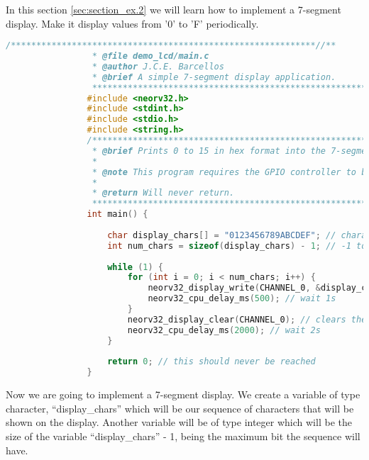         In this section \autoref{sec:section_ex.2} we will learn how to implement a 7-segment display. Make it display values from '0' to 'F' periodically. 

            \begin{lstlisting}[style=mystyle_c, language=c, breaklines]
                /************************************************************//**
                 * @file demo_lcd/main.c
                 * @author J.C.E. Barcellos
                 * @brief A simple 7-segment display application.
                 ***************************************************************/
                #include <neorv32.h>
                #include <stdint.h>
                #include <stdio.h>
                #include <string.h>
                /************************************************************//**
                 * @brief Prints 0 to 15 in hex format into the 7-segment display.
                 *
                 * @note This program requires the GPIO controller to be synthesized.
                 *
                 * @return Will never return.
                 ***************************************************************/
                int main() {
                
                	char display_chars[] = "0123456789ABCDEF"; // characters to be displayed in sequence
                	int num_chars = sizeof(display_chars) - 1; // -1 to exclude the null terminator
                
                	while (1) {
                		for (int i = 0; i < num_chars; i++) {
                			neorv32_display_write(CHANNEL_0, &display_chars[i]); // display each charater to the 7-segment display
                			neorv32_cpu_delay_ms(500); // wait 1s
                		}
                		neorv32_display_clear(CHANNEL_0); // clears the 7-segment display
                		neorv32_cpu_delay_ms(2000); // wait 2s
                	}
                
                	return 0; // this should never be reached
                }       
        \end{lstlisting}

        Now we are going to implement a 7-segment display. We create a variable of type character, ``display\_chars'' which will be our sequence of characters that will be shown on the display. Another variable will be of type integer which will be the size of the variable ``display\_chars'' - 1, being the maximum bit the sequence will have.
    
